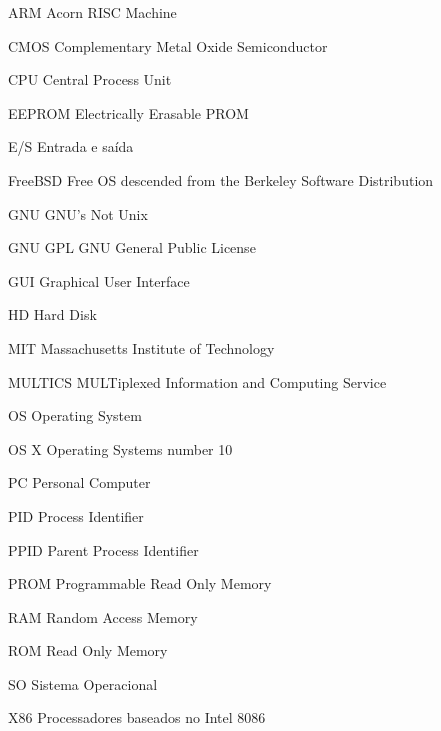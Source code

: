 \begin{siglas}
    \item[ARM] Acorn RISC Machine
    \item[CMOS] Complementary Metal Oxide Semiconductor
    \item[CPU] Central Process Unit
    \item[EEPROM] Electrically Erasable PROM 
    \item[E/S] Entrada e saída
    \item[FreeBSD] Free OS descended from the 
    Berkeley Software Distribution 
    \item[GNU] GNU's Not Unix
    \item[GNU GPL] GNU General Public License
    \item[GUI] Graphical User Interface
    \item[HD] Hard Disk
    \item[MIT] Massachusetts Institute of Technology
    \item[MULTICS] MULTiplexed Information and Computing Service 
    \item[OS] Operating System  
    \item[OS X] Operating Systems number 10 
    \item[PC] Personal Computer
    \item[PID] Process Identifier
    \item[PPID] Parent Process Identifier
    \item[PROM] Programmable Read Only Memory
    \item[RAM] Random Access Memory
    \item[ROM] Read Only Memory 
    \item[SO] Sistema Operacional
    \item[X86] Processadores baseados no Intel 8086
\end{siglas}